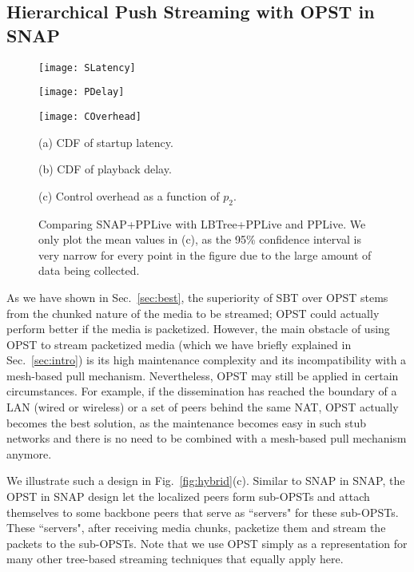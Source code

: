 \documentclass[conference]{IEEEtran}
\begin{document}
\subsection{Hierarchical Push Streaming with OPST in SNAP}
\begin{figure*}[ht]
   \begin{center}
       \parbox{\textwidth}{\parbox{.33\textwidth}{\center\texttt{[image: SLatency]}}
                           \parbox{.33\textwidth}{\center\texttt{[image: PDelay]}}
                           \parbox{.33\textwidth}{\center\texttt{[image: COverhead]}}}
       \vspace{-2mm}
       \parbox{\textwidth}{\parbox{.33\textwidth}{\center\scriptsize(a) CDF of startup  latency.}
                           \parbox{.33\textwidth}{\center\scriptsize(b) CDF of playback delay.}
                           \parbox{.33\textwidth}{\center\footnotesize(c) Control overhead as a function of $p_2$.}}
       \vspace{-2ex}
    \caption{Comparing SNAP+PPLive with LBTree+PPLive and PPLive. We only plot the mean values in (c), as the 95\% confidence interval is very narrow for every point in the figure due to the large amount of data being collected.}\label{fig:comp}
   \end{center}
   \vspace{-2ex}
  \end{figure*}

  As we have shown in Sec.~\ref{sec:best}, the superiority of SBT over OPST stems from the chunked nature of the media to be streamed; OPST could actually perform better if the media is packetized. However, the main obstacle of using OPST to stream packetized media (which we have briefly explained in Sec.~\ref{sec:intro}) is its high maintenance complexity and its incompatibility with a mesh-based pull mechanism. Nevertheless, OPST may still be applied in certain circumstances. For example, if the dissemination has reached the boundary of a LAN (wired or wireless) or a set of peers behind the same NAT, OPST actually becomes the best solution, as the maintenance becomes easy in such stub networks and there is no need to be combined with a mesh-based pull mechanism anymore.

  We illustrate such a design in Fig.~\ref{fig:hybrid}(c). Similar to SNAP in SNAP, the OPST in SNAP design let the localized peers form sub-OPSTs and attach themselves to some backbone peers that serve as ``servers" for these sub-OPSTs. These ``servers", after receiving media chunks, packetize them and stream the packets to the sub-OPSTs. Note that we use OPST simply as a representation for many other tree-based streaming techniques \cite{CastroDKNRS-SOSP03,VenkataramanYF-ICNP06,LiuSJRC-SIGMETRICS08} that equally apply here.
\end{document}
